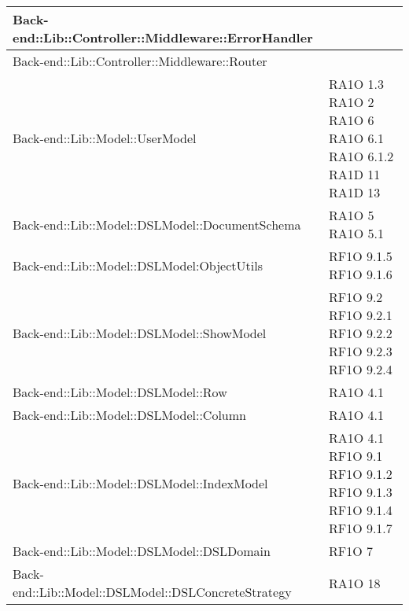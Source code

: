 \begin{center}
\begin{longtable}{ | p{11cm} | p{3cm} | }
	Back-end::Lib::Controller::Middleware::ErrorHandler & \\ \hline
	
	Back-end::Lib::Controller::Middleware::Router & \\ \hline
	
	Back-end::Lib::Model::UserModel & RA1O 1.3 \newline RA1O 2 \newline RA1O 6 \newline RA1O 6.1 \newline 
										RA1O 6.1.2 \newline RA1D 11 \newline RA1D 13 \\ \hline
	
	Back-end::Lib::Model::DSLModel::DocumentSchema & RA1O 5 \newline RA1O 5.1 \\ \hline
	
	Back-end::Lib::Model::DSLModel:ObjectUtils & RF1O 9.1.5 \newline RF1O 9.1.6 \\ \hline
	
	Back-end::Lib::Model::DSLModel::ShowModel & RF1O 9.2 \newline RF1O 9.2.1 \newline RF1O 9.2.2 \newline
												 RF1O 9.2.3 \newline RF1O 9.2.4 \\ \hline

	Back-end::Lib::Model::DSLModel::Row & RA1O 4.1 \\ \hline
	
	Back-end::Lib::Model::DSLModel::Column & RA1O 4.1 \\ \hline
	
	Back-end::Lib::Model::DSLModel::IndexModel & RA1O 4.1 \newline RF1O 9.1 \newline RF1O 9.1.2 \newline
												 RF1O 9.1.3 \newline RF1O 9.1.4  \newline RF1O 9.1.7  \\ \hline
	
	Back-end::Lib::Model::DSLModel::DSLDomain & RF1O 7 \\ \hline
	
	Back-end::Lib::Model::DSLModel::DSLConcreteStrategy & RA1O 18 \\ \hline
	

\end{longtable}
\end{center}
